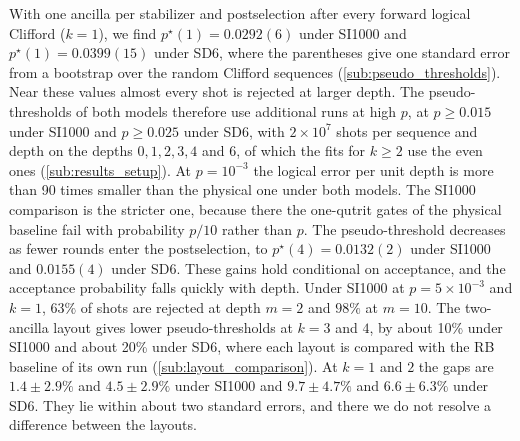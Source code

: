 With one ancilla per stabilizer and postselection after every forward logical Clifford ($k=1$), we find $p^\star(1) = 0.0292(6)$ under SI1000 and $p^\star(1) = 0.0399(15)$ under SD6, where the parentheses give one standard error from a bootstrap over the random Clifford sequences (\autoref{sub:pseudo_thresholds}).
Near these values almost every shot is rejected at larger depth. The pseudo-thresholds of both models therefore use additional runs at high $p$, at $p \geq 0.015$ under SI1000 and $p \geq 0.025$ under SD6, with $2\times 10^{7}$ shots per sequence and depth on the depths $0, 1, 2, 3, 4$ and $6$, of which the fits for $k \ge 2$ use the even ones (\autoref{sub:results_setup}).
At $p = 10^{-3}$ the logical error per unit depth is more than 90 times smaller than the physical one under both models. The SI1000 comparison is the stricter one, because there the one-qutrit gates of the physical baseline fail with probability $p/10$ rather than $p$. The pseudo-threshold decreases as fewer rounds enter the postselection, to $p^\star(4) = 0.0132(2)$ under SI1000 and $0.0155(4)$ under SD6.
These gains hold conditional on acceptance, and the acceptance probability falls quickly with depth. Under SI1000 at $p = 5\times 10^{-3}$ and $k = 1$, $63\%$ of shots are rejected at depth $m = 2$ and $98\%$ at $m = 10$.
The two-ancilla layout gives lower pseudo-thresholds at $k = 3$ and $4$, by about 10\% under SI1000 and about 20\% under SD6, where each layout is compared with the RB baseline of its own run (\autoref{sub:layout_comparison}). At $k = 1$ and $2$ the gaps are $1.4 \pm 2.9\%$ and $4.5 \pm 2.9\%$ under SI1000 and $9.7 \pm 4.7\%$ and $6.6 \pm 6.3\%$ under SD6. They lie within about two standard errors, and there we do not resolve a difference between the layouts.

